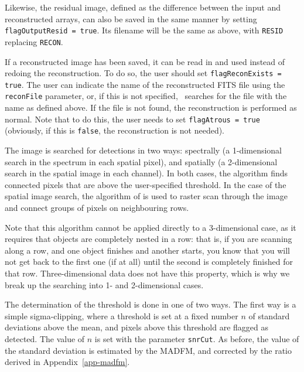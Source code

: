 Likewise, the residual image, defined as the difference between the
input and reconstructed arrays, can also be saved in the same manner
by setting \texttt{flagOutputResid = true}. Its filename will be the
same as above, with \texttt{RESID} replacing \texttt{RECON}.

If a reconstructed image has been saved, it can be read in and used
instead of redoing the reconstruction. To do so, the user should set
\texttt{flagReconExists = true}. The user can indicate the name of the
reconstructed FITS file using the \texttt{reconFile} parameter, or, if
this is not specified, \duchamp\ searches for the file with the name
as defined above. If the file is not found, the reconstruction is
performed as normal. Note that to do this, the user needs to set
\texttt{flagAtrous = true} (obviously, if this is \texttt{false}, the
reconstruction is not needed).

\label{sec-detection}

The image is searched for detections in two ways: spectrally (a
1-dimensional search in the spectrum in each spatial pixel), and
spatially (a 2-dimensional search in the spatial image in each
channel). In both cases, the algorithm finds connected pixels that are
above the user-specified threshold. In the case of the spatial image
search, the algorithm of \citet{lutz80} is used to raster scan through
the image and connect groups of pixels on neighbouring rows.

Note that this algorithm cannot be applied directly to a 3-dimensional
case, as it requires that objects are completely nested in a row: that
is, if you are scanning along a row, and one object finishes and
another starts, you know that you will not get back to the first one
(if at all) until the second is completely finished for that
row. Three-dimensional data does not have this property, which is why
we break up the searching into 1- and 2-dimensional cases.

The determination of the threshold is done in one of two ways. The
first way is a simple sigma-clipping, where a threshold is set at a
fixed number $n$ of standard deviations above the mean, and pixels
above this threshold are flagged as detected. The value of $n$ is set
with the parameter \texttt{snrCut}. As before, the value of the
standard deviation is estimated by the MADFM, and corrected by the
ratio derived in Appendix~\ref{app-madfm}.

